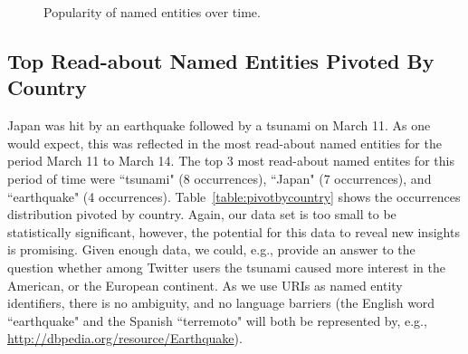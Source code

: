 \documentclass[runningheads,a4paper]{llncs}
\begin{document}
\begin{figure}[ht!]
  \begin{center}
  \end{center}
  \caption{Popularity of named entities over time.}
  \label{fig:overtime}
\end{figure}

\subsection{Top Read-about Named Entities Pivoted By Country}
Japan was hit by an earthquake followed by a tsunami on March 11. As one would expect, this was reflected in the most read-about named entities for the period March 11 to March 14. The top 3 most read-about named entites for this period of time were ``tsunami" (8 occurrences), ``Japan" (7 occurrences), and ``earthquake" (4 occurrences). Table~\ref{table:pivotbycountry} shows the occurrences distribution pivoted by country. Again, our data set is too small to be statistically significant, however, the potential for this data to reveal new insights is promising. Given enough data, we could, e.g., provide an answer to the question whether among Twitter users the tsunami caused more interest in the American, or the European continent. As we use URIs as named entity identifiers, there is no ambiguity, and no language barriers (the English word ``earthquake" and the Spanish ``terremoto" will both be represented by, e.g., \url{http://dbpedia.org/resource/Earthquake}).
\end{document}
